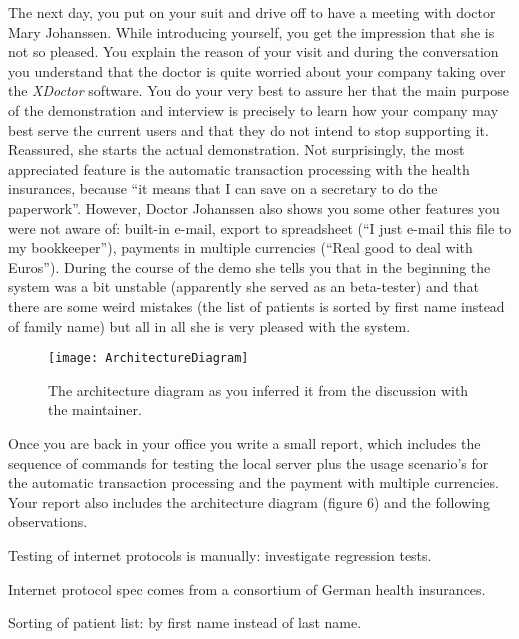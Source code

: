\documentclass[a4paper,10pt,twoside]{book}
\begin{document}
The next day, you put on your suit and drive off to have a meeting with doctor Mary Johanssen. While introducing yourself, you get the impression that she is not so pleased. You explain the reason of your visit and during the conversation you understand that the doctor is quite worried about your company taking over the \emph{XDoctor} software. You do your very best to assure her that the main purpose of the demonstration and interview is precisely to learn how your company may best serve the current users and that they do not intend to stop supporting it. Reassured, she starts the actual demonstration. Not surprisingly, the most appreciated feature is the automatic transaction processing with the health insurances, because ``it means that I can save on a secretary to do the paperwork''. However, Doctor Johanssen also shows you some other features you were not aware of: built-in e-mail, export to spreadsheet (``I just e-mail this file to my bookkeeper''), payments in multiple currencies (``Real good to deal with Euros''). During the course of the demo she tells you that in the beginning the system was a bit unstable (apparently she served as an beta-tester) and that there are some weird mistakes (the list of patients is sorted by first name instead of family name) but all in all she is very pleased with the system.

\begin{figure}
\begin{center}
\texttt{[image: ArchitectureDiagram]}
\caption{The architecture diagram as you inferred it from the discussion with the maintainer.}
\end{center}
\end{figure}

Once you are back in your office you write a small report, which includes the sequence of commands for testing the local server plus the usage scenario's for the automatic transaction processing and the payment with multiple currencies. Your report also includes the architecture diagram (figure 6) and the following observations.

\begin{bulletlist}
  \item Testing of internet protocols is manually: investigate regression tests.

  \item Internet protocol spec comes from a consortium of German health insurances.

  \item Sorting of patient list: by first name instead of last name.
\end{bulletlist}
\end{document}
